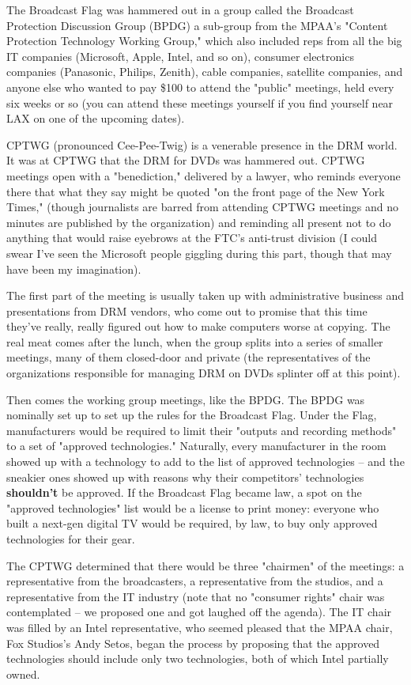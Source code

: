The Broadcast Flag was hammered out in a group called the Broadcast
Protection Discussion Group (BPDG) a sub-group from the MPAA's
"Content Protection Technology Working Group," which also included
reps from all the big IT companies (Microsoft, Apple, Intel, and so
on), consumer electronics companies (Panasonic, Philips, Zenith),
cable companies, satellite companies, and anyone else who wanted to
pay \$100 to attend the "public" meetings, held every six weeks or
so (you can attend these meetings yourself if you find yourself
near LAX on one of the upcoming dates).

CPTWG (pronounced Cee-Pee-Twig) is a venerable presence in the DRM
world. It was at CPTWG that the DRM for DVDs was hammered out.
CPTWG meetings open with a "benediction," delivered by a lawyer,
who reminds everyone there that what they say might be quoted "on
the front page of the New York Times," (though journalists are
barred from attending CPTWG meetings and no minutes are published
by the organization) and reminding all present not to do anything
that would raise eyebrows at the FTC's anti-trust division (I could
swear I've seen the Microsoft people giggling during this part,
though that may have been my imagination).

The first part of the meeting is usually taken up with
administrative business and presentations from DRM vendors, who
come out to promise that this time they've really, really figured
out how to make computers worse at copying. The real meat comes
after the lunch, when the group splits into a series of smaller
meetings, many of them closed-door and private (the representatives
of the organizations responsible for managing DRM on DVDs splinter
off at this point).

Then comes the working group meetings, like the BPDG. The BPDG was
nominally set up to set up the rules for the Broadcast Flag. Under
the Flag, manufacturers would be required to limit their "outputs
and recording methods" to a set of "approved technologies."
Naturally, every manufacturer in the room showed up with a
technology to add to the list of approved technologies -- and the
sneakier ones showed up with reasons why their competitors'
technologies \textbf{shouldn't} be approved. If the Broadcast Flag
became law, a spot on the "approved technologies" list would be a
license to print money: everyone who built a next-gen digital TV
would be required, by law, to buy only approved technologies for
their gear.

The CPTWG determined that there would be three "chairmen" of the
meetings: a representative from the broadcasters, a representative
from the studios, and a representative from the IT industry (note
that no "consumer rights" chair was contemplated -- we proposed one
and got laughed off the agenda). The IT chair was filled by an
Intel representative, who seemed pleased that the MPAA chair, Fox
Studios's Andy Setos, began the process by proposing that the
approved technologies should include only two technologies, both of
which Intel partially owned.

